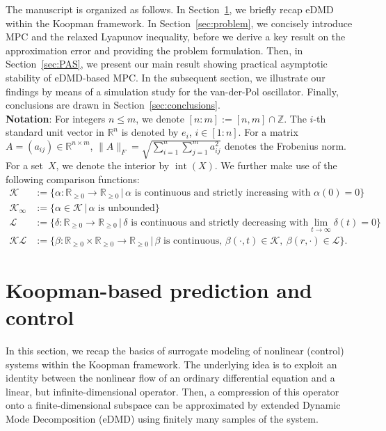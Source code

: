 \documentclass{article}
\numberwithin{equation}{section}
\newcommand{\R}{\mathbb{R}}
\newcommand{\calK}{\mathcal K}
\newcommand{\calL}{\mathcal L}
\begin{document}
	\noindent The manuscript is organized as follows. In Section~\ref{sec:eDMD}, we briefly recap eDMD within the Koopman framework.
	In Section~\ref{sec:problem}, we concisely introduce MPC and the relaxed Lyapunov inequality, before we derive a key result on the approximation error and providing the problem formulation. Then, in Section~\ref{sec:PAS}, we present our main result showing practical asymptotic stability of eDMD-based MPC. In the subsequent section, we illustrate our findings by means of a simulation study for the van-der-Pol oscillator. Finally, conclusions are drawn in Section~\ref{sec:conclusions}.
	\\
	
	\noindent\textbf{Notation}: For integers $n \leq m$, we denote $[n:m] := [n,m] \cap \mathbb{Z}$. The $i$-th standard unit vector in $\mathbb{R}^n$ is denoted by $e_i$, $i\in [1:n]$. For a matrix $A=(a_{ij})\in \R^{n\times m}$, $\|A\|_F=\sqrt{\sum_{i=1}^{n}\sum_{j=1}^m a_{ij}^2}$ denotes the Frobenius norm. For a set~$X$, we denote the interior by $\operatorname{int}(X)$. 
	We further make use of the following comparison functions:
	\begin{align*}
	\calK&:= \{\alpha:\R_{\geq 0} \to \R_{\geq 0}\,|\,\alpha\text{ is continuous and strictly increasing with }\alpha(0)=0\}\\
	\calK_\infty &:= \{\alpha \in \calK\,|\, \alpha \text{ is unbounded}\}\\
	\calL &:= \{\delta : \R_{\geq 0} \to \R_{\geq 0}\,|\, \delta\text{ is continuous and strictly decreasing with}\lim_{t\to \infty}\delta(t)=0\}\\
	\calK\calL &:= \{\beta: \R_{\geq 0}\times \R_{\geq 0} \to \R_{\geq 0}\,|\, \beta\text{ is continuous, }\beta(\cdot,t)\in \calK,\ \beta(r,\cdot)\in \calL\}.
	\end{align*}
	
	
	
	
	
	
	\section{Koopman-based prediction and control}
	\label{sec:eDMD}
	
	In this section, we recap the basics of surrogate modeling of nonlinear (control) systems within the Koopman framework. The underlying idea is to exploit an identity between the nonlinear flow of an ordinary differential equation and a linear, but infinite-dimensional operator. Then, a compression of this %
	operator onto a finite-dimensional subspace can be approximated by extended Dynamic Mode Decomposition (eDMD) using finitely many samples of the system.
	
\end{document}
